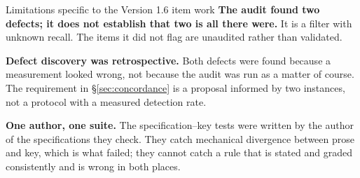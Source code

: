 \documentclass[11pt]{article}
\theoremstyle{definition}
\begin{document}
\begin{cautionbox}{Limitations specific to the Version 1.6 item work}
\textbf{The audit found two defects; it does not establish that two is all there were.} It is a filter with unknown recall. The items it did not flag are unaudited rather than validated.

\textbf{Defect discovery was retrospective.} Both defects were found because a measurement looked wrong, not because the audit was run as a matter of course. The requirement in \S\ref{sec:concordance} is a proposal informed by two instances, not a protocol with a measured detection rate.

\textbf{One author, one suite.} The specification--key tests were written by the author of the specifications they check. They catch mechanical divergence between prose and key, which is what failed; they cannot catch a rule that is stated and graded consistently and is wrong in both places.
\end{cautionbox}
\end{document}
